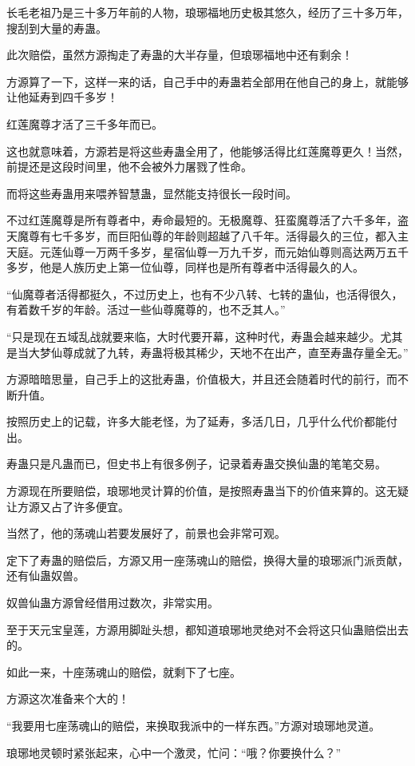 \begin{this_body}
长毛老祖乃是三十多万年前的人物，琅琊福地历史极其悠久，经历了三十多万年，搜刮到大量的寿蛊。

此次赔偿，虽然方源掏走了寿蛊的大半存量，但琅琊福地中还有剩余！

方源算了一下，这样一来的话，自己手中的寿蛊若全部用在他自己的身上，就能够让他延寿到四千多岁！

红莲魔尊才活了三千多年而已。

这也就意味着，方源若是将这些寿蛊全用了，他能够活得比红莲魔尊更久！当然，前提还是这段时间里，他不会被外力屠戮了性命。

而将这些寿蛊用来喂养智慧蛊，显然能支持很长一段时间。

不过红莲魔尊是所有尊者中，寿命最短的。无极魔尊、狂蛮魔尊活了六千多年，盗天魔尊有七千多岁，而巨阳仙尊的年龄则超越了八千年。活得最久的三位，都入主天庭。元莲仙尊一万两千多岁，星宿仙尊一万九千岁，而元始仙尊则高达两万五千多岁，他是人族历史上第一位仙尊，同样也是所有尊者中活得最久的人。

“仙魔尊者活得都挺久，不过历史上，也有不少八转、七转的蛊仙，也活得很久，有着数千岁的年龄。活过一些仙尊魔尊的，也不乏其人。”

“只是现在五域乱战就要来临，大时代要开幕，这种时代，寿蛊会越来越少。尤其是当大梦仙尊成就了九转，寿蛊将极其稀少，天地不在出产，直至寿蛊存量全无。”

方源暗暗思量，自己手上的这批寿蛊，价值极大，并且还会随着时代的前行，而不断升值。

按照历史上的记载，许多大能老怪，为了延寿，多活几日，几乎什么代价都能付出。

寿蛊只是凡蛊而已，但史书上有很多例子，记录着寿蛊交换仙蛊的笔笔交易。

方源现在所要赔偿，琅琊地灵计算的价值，是按照寿蛊当下的价值来算的。这无疑让方源又占了许多便宜。

当然了，他的荡魂山若要发展好了，前景也会非常可观。

定下了寿蛊的赔偿后，方源又用一座荡魂山的赔偿，换得大量的琅琊派门派贡献，还有仙蛊奴兽。

奴兽仙蛊方源曾经借用过数次，非常实用。

至于天元宝皇莲，方源用脚趾头想，都知道琅琊地灵绝对不会将这只仙蛊赔偿出去的。

如此一来，十座荡魂山的赔偿，就剩下了七座。

方源这次准备来个大的！

“我要用七座荡魂山的赔偿，来换取我派中的一样东西。”方源对琅琊地灵道。

琅琊地灵顿时紧张起来，心中一个激灵，忙问：“哦？你要换什么？”

\end{this_body}

